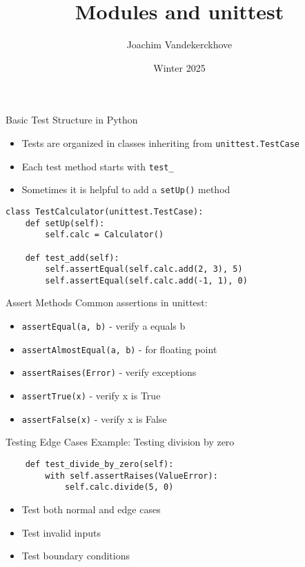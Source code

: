 \documentclass[aspectratio=169]{beamer}
\title{Modules and unittest}
\author{Joachim Vandekerckhove}
\date{Winter 2025}
\begin{document}
\maketitle


\begin{frame}[fragile]{Basic Test Structure in Python}
    \begin{itemize}
        \item Tests are organized in classes inheriting from \texttt{unittest.TestCase}
        \item Each test method starts with \texttt{test\_}
        \item Sometimes it is helpful to add a \texttt{setUp()} method
    \end{itemize}
    \begin{verbatim}
class TestCalculator(unittest.TestCase):
    def setUp(self):
        self.calc = Calculator()

    def test_add(self):
        self.assertEqual(self.calc.add(2, 3), 5)
        self.assertEqual(self.calc.add(-1, 1), 0)
    \end{verbatim}
\end{frame}

\begin{frame}{Assert Methods}
    Common assertions in unittest:
    \begin{itemize}
        \item \texttt{assertEqual(a, b)} - verify a equals b
        \item \texttt{assertAlmostEqual(a, b)} - for floating point
        \item \texttt{assertRaises(Error)} - verify exceptions
        \item \texttt{assertTrue(x)} - verify x is True
        \item \texttt{assertFalse(x)} - verify x is False
    \end{itemize}
\end{frame}

\begin{frame}[fragile]{Testing Edge Cases}
    Example: Testing division by zero
    \begin{verbatim}
    def test_divide_by_zero(self):
        with self.assertRaises(ValueError):
            self.calc.divide(5, 0)
    \end{verbatim}
    \begin{itemize}
        \item Test both normal and edge cases
        \item Test invalid inputs
        \item Test boundary conditions
    \end{itemize}
\end{frame}
\end{document}
